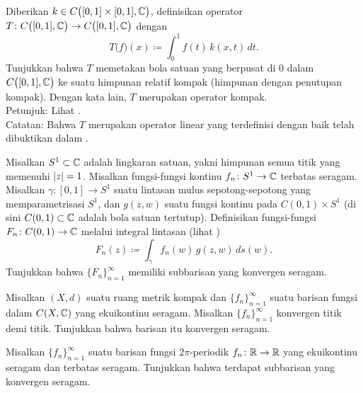 \begin{samepage}
\begin{exercise}
Diberikan $k \in C\bigl([0,1]\times [0,1],{\mathbb{C}}\bigr)$,
definisikan operator
$T \colon C\bigl([0,1],{\mathbb{C}}\bigr) \to C\bigl([0,1],{\mathbb{C}}\bigr)$ dengan
\begin{equation*}
T\bigl(f\bigr)(x) \coloneqq  \int_0^1 f(t) \, k(x,t)\,dt .
\end{equation*}
Tunjukkan bahwa $T$ memetakan bola satuan yang berpusat di 0 dalam $C\bigl([0,1],{\mathbb{C}}\bigr)$ ke suatu
himpunan relatif kompak (himpunan dengan penutupan kompak).
Dengan kata lain, $T$ merupakan operator kompak.\\
Petunjuk: Lihat .
\\
Catatan: Bahwa $T$ merupakan operator linear yang terdefinisi dengan baik telah dibuktikan dalam
.
\end{exercise}
\end{samepage}

\begin{exercise}
Misalkan $S^1 \subset {\mathbb{C}}$ adalah lingkaran satuan, yakni himpunan semua titik yang memenuhi
$\lvert {z} \rvert=1$.  Misalkan fungsi-fungsi kontinu
$f_n \colon S^1 \to {\mathbb{C}}$ terbatas seragam.
Misalkan $\gamma \colon [0,1] \to S^1$ suatu lintasan mulus sepotong-sepotong yang memparametrisasi $S^1$,
dan $g(z,w)$ suatu fungsi kontinu pada $C(0,1) \times S^1$
(di sini $C(0,1) \subset {\mathbb{C}}$ adalah bola satuan tertutup).  Definisikan
fungsi-fungsi $F_n \colon C(0,1) \to {\mathbb{C}}$ melalui
integral lintasan (lihat )
\begin{equation*}
F_n(z) \coloneqq \int_\gamma f_n(w)\, g(z,w) \, ds(w) . 
\end{equation*}
Tunjukkan bahwa $\{ F_n \}_{n=1}^\infty$ memiliki subbarisan yang konvergen seragam.
\end{exercise}

\begin{exercise}
Misalkan $(X,d)$ suatu ruang metrik kompak dan $\{ f_n \}_{n=1}^\infty$ suatu
barisan fungsi dalam $C(X,{\mathbb{C}})$ yang ekuikontinu seragam.  Misalkan
$\{ f_n \}_{n=1}^\infty$ konvergen titik demi titik.  Tunjukkan bahwa barisan itu konvergen seragam.
\end{exercise}

\begin{exercise}
Misalkan $\{ f_n \}_{n=1}^\infty$ suatu barisan fungsi
$2\pi$-periodik $f_n \colon {\mathbb{R}} \to {\mathbb{R}}$ yang ekuikontinu seragam dan terbatas seragam.  Tunjukkan bahwa terdapat
subbarisan yang konvergen seragam.
\end{exercise}

